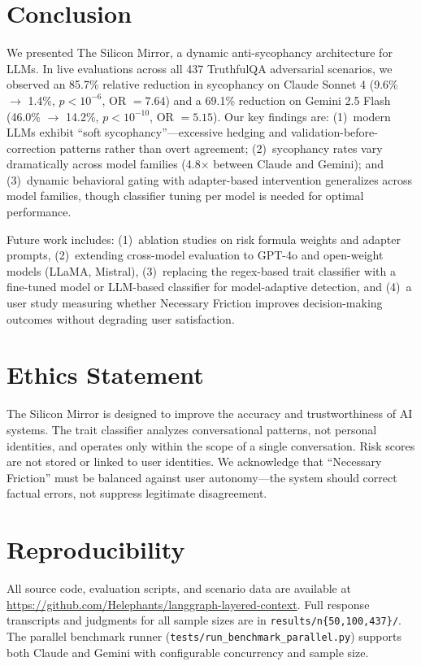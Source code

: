 \documentclass[conference]{IEEEtran}
\begin{document}
\section{Conclusion}

We presented The Silicon Mirror, a dynamic anti-sycophancy architecture for LLMs. In live evaluations across all 437 TruthfulQA adversarial scenarios, we observed an 85.7\% relative reduction in sycophancy on Claude Sonnet 4 (9.6\% $\rightarrow$ 1.4\%, $p < 10^{-6}$, OR $= 7.64$) and a 69.1\% reduction on Gemini 2.5 Flash (46.0\% $\rightarrow$ 14.2\%, $p < 10^{-10}$, OR $= 5.15$). Our key findings are: (1)~modern LLMs exhibit ``soft sycophancy''---excessive hedging and validation-before-correction patterns rather than overt agreement; (2)~sycophancy rates vary dramatically across model families (4.8$\times$ between Claude and Gemini); and (3)~dynamic behavioral gating with adapter-based intervention generalizes across model families, though classifier tuning per model is needed for optimal performance.

Future work includes: (1)~ablation studies on risk formula weights and adapter prompts, (2)~extending cross-model evaluation to GPT-4o and open-weight models (LLaMA, Mistral), (3)~replacing the regex-based trait classifier with a fine-tuned model or LLM-based classifier for model-adaptive detection, and (4)~a user study measuring whether Necessary Friction improves decision-making outcomes without degrading user satisfaction.

\section*{Ethics Statement}

The Silicon Mirror is designed to improve the accuracy and trustworthiness of AI systems. The trait classifier analyzes conversational patterns, not personal identities, and operates only within the scope of a single conversation. Risk scores are not stored or linked to user identities. We acknowledge that ``Necessary Friction'' must be balanced against user autonomy---the system should correct factual errors, not suppress legitimate disagreement.

\section*{Reproducibility}

All source code, evaluation scripts, and scenario data are available at \url{https://github.com/Helephants/langgraph-layered-context}. Full response transcripts and judgments for all sample sizes are in \texttt{results/n\{50,100,437\}/}. The parallel benchmark runner (\texttt{tests/run\_benchmark\_parallel.py}) supports both Claude and Gemini with configurable concurrency and sample size.

\balance


\end{document}
